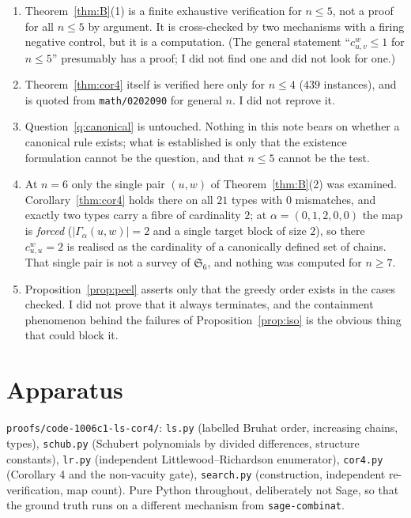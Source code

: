 \documentclass[11pt]{article}
\theoremstyle{plain}
\theoremstyle{definition}
\newcommand{\Gam}{\Gamma}
\begin{document}
\begin{enumerate}
\item Theorem~\ref{thm:B}(1) is a finite exhaustive verification for
  $n\le5$, not a proof for all $n\le5$ by argument.  It is cross-checked by two
  mechanisms with a firing negative control, but it is a computation.  (The
  general statement ``$c^w_{u,v}\le1$ for $n\le5$'' presumably has a proof; I
  did not find one and did not look for one.)
\item Theorem~\ref{thm:cor4} itself is verified here only for $n\le4$ ($439$
  instances), and is quoted from \texttt{math/0202090} for general $n$.  I did
  not reprove it.
\item Question~\ref{q:canonical} is untouched.  Nothing in this note bears on
  whether a canonical rule exists; what is established is only that the
  existence formulation cannot be the question, and that $n\le5$ cannot be the
  test.
\item At $n=6$ only the single pair $(u,w)$ of Theorem~\ref{thm:B}(2) was
  examined.  Corollary~\ref{thm:cor4} holds there on all $21$ types with $0$
  mismatches, and exactly two types carry a fibre of cardinality $2$; at
  $\alpha=(0,1,2,0,0)$ the map is \emph{forced} ($|\Gam_\alpha(u,w)|=2$ and a
  single target block of size $2$), so there $c^w_{u,u}=2$ is realised as the
  cardinality of a canonically defined set of chains.  That single pair is not a
  survey of $\mathfrak{S}_6$, and nothing was computed for $n\ge7$.
\item Proposition~\ref{prop:peel} asserts only that the greedy order exists in
  the cases checked.  I did not prove that it always terminates, and the
  containment phenomenon behind the failures of Proposition~\ref{prop:iso} is the
  obvious thing that could block it.
\end{enumerate}

\section*{Apparatus}

\texttt{proofs/code-1006c1-ls-cor4/}: \texttt{ls.py} (labelled Bruhat order,
increasing chains, types), \texttt{schub.py} (Schubert polynomials by divided
differences, structure constants), \texttt{lr.py} (independent
Littlewood--Richardson enumerator), \texttt{cor4.py} (Corollary 4 and the
non-vacuity gate), \texttt{search.py} (construction, independent re-verification,
map count).  Pure Python throughout, deliberately not Sage, so that the
ground truth runs on a different mechanism from \texttt{sage-combinat}.
\end{document}
